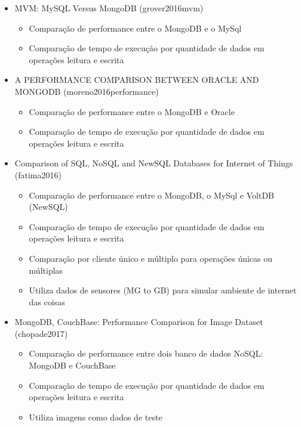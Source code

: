 \begin{itemize}
    \item MVM: MySQL Versus MongoDB (grover2016mvm)
    
        \begin{itemize}
            \item Comparação de performance entre o  MongoDB e o MySql
            \item Comparação de tempo de execução por quantidade de dados em operações leitura e escrita
        \end{itemize}
        
    \item A PERFORMANCE COMPARISON BETWEEN ORACLE AND MONGODB (moreno2016performance)
    
        \begin{itemize}
            \item Comparação de performance entre o MongoDB e Oracle
            \item Comparação de tempo de execução por quantidade de dados em operações leitura e escrita
        \end{itemize}
        
    \item Comparison of SQL, NoSQL and NewSQL Databases for Internet of Things (fatima2016)
    
        \begin{itemize}
            \item Comparação de performance entre o  MongoDB, o MySql e VoltDB (NewSQL)
            \item Comparação de tempo de execução por quantidade de dados em operações leitura e escrita
            \item Comparação por cliente único e múltiplo para operações únicas ou múltiplas
            \item Utiliza dados de sensores (MG to GB) para simular ambiente de internet das coisas
        \end{itemize}
        
    \item MongoDB, CouchBase: Performance Comparison for Image Dataset (chopade2017)
    
        \begin{itemize}
            \item Comparação de performance entre dois banco de dados NoSQL: MongoDB e CouchBase
            \item Comparação de tempo de execução por quantidade de dados em operações leitura e escrita
            \item Utiliza imagens como dados de teste
        \end{itemize}
        

\end{itemize}
